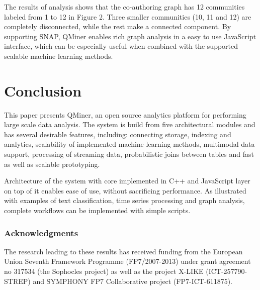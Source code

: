 \documentclass{article} %
\begin{document}
The results of analysis shows that the co-authoring graph has 12 communities labeled from 1 to 12 in Figure 2. Three smaller communities (10, 11 and 12) are completely disconnected, while the rest make a connected component. By supporting SNAP, QMiner enables rich graph analysis in a easy to use JavaScript interface, which can be especially useful when combined with the supported scalable machine learning methods.

\section{Conclusion}

This paper presents QMiner, an open source analytics platform for performing large scale data analysis. The system is build from five architectural modules and has several desirable features, including: connecting storage, indexing and analytics, scalability of implemented machine learning methods, multimodal data support, processing of streaming data, probabilistic joins between tables and fast as well as scalable prototyping.

Architecture of the system with core implemented in C++ and JavaScript layer on top of it enables ease of use, without sacrificing performance. As illustrated with examples of text classification, time series processing and graph analysis, complete workflows can be implemented with simple scripts.

\subsubsection*{Acknowledgments}
The research leading to these results has received funding from the European Union Seventh Framework Programme (FP7/2007-2013) under grant agreement no 317534 (the Sophocles project) as well as the project X-LIKE (ICT-257790-STREP)\cite{xlike} and SYMPHONY FP7 Collaborative project (FP7-ICT-611875).



\end{document}
